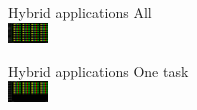 \documentclass[10pt,xcolor=table]{beamer}
\begin{document}
\begin{frame}{Hybrid applications}
\vspace{30ex}
All\\
\includegraphics[width=0.08\textwidth]{figs/Parallel_functions@luleshMPI_OMP.chop1.png}
\end{frame}

\begin{frame}{Hybrid applications}
\vspace{30ex}
One task\\
\includegraphics[width=0.08\textwidth]{figs/Parallel_functions@luleshMPI_OMP.chop1onetask.png}
\end{frame}
\end{document}

